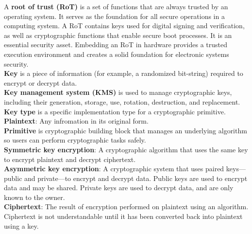 \documentclass[pdflatex,sn-mathphys-num]{sn-jnl}%
\theoremstyle{thmstyleone}%
\theoremstyle{thmstyletwo}%
\theoremstyle{thmstylethree}%
\begin{document}

\noindent A \textbf{root of trust (RoT)} is a set of functions that are always trusted by an operating system. It serves as the foundation for all secure operations in a computing system. A RoT contains keys used for digital signing and verification, as well as cryptographic functions that enable secure boot processes. It is an essential security asset. Embedding an RoT in hardware provides a trusted execution environment and creates a solid foundation for electronic systems security.\\

\noindent \textbf{Key} is a piece of information (for example, a randomized bit-string) required to encrypt or decrypt data.\\

\noindent \textbf{Key management system (KMS)} is used to manage cryptographic keys, including their generation, storage, use, rotation, destruction, and replacement.\\

\noindent \textbf{Key type} is a specific implementation type for a cryptographic primitive.\\

\noindent \textbf{Plaintext}: Any infromation in its original form.\\

\noindent \textbf{Primitive} is  cryptographic building block that manages an underlying algorithm so users can perform cryptographic tasks safely. \\

\noindent \textbf{Symmetric key encryption}: A cryptographic algorithm that uses the same key to encrypt plaintext and decrypt ciphertext.\\

\noindent \textbf{Asymmetric key encryption}: A cryptographic system that uses paired keys—public and private—to encrypt and decrypt data. Public keys are used to encrypt data and may be shared. Private keys are used to decrypt data, and are only known to the owner.\\

\noindent \textbf{Ciphertext}: The result of encryption performed on plaintext using an algorithm. Ciphertext is not understandable until it has been converted back into plaintext using a key.\\
\end{document}
